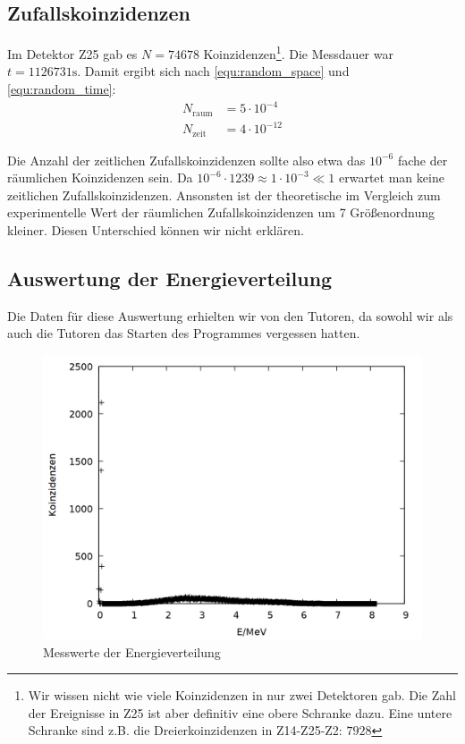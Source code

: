 \subsection{Zufallskoinzidenzen}
Im Detektor Z25 gab es $N = 74678$ Koinzidenzen\footnote{Wir wissen nicht wie viele Koinzidenzen in nur zwei Detektoren gab. Die Zahl der Ereignisse in Z25 ist aber definitiv eine obere Schranke dazu. Eine untere Schranke sind z.B. die Dreierkoinzidenzen in Z14-Z25-Z2: $7928$}. Die Messdauer war $t = 1126731 \si{\second}$. Damit ergibt sich nach \ref{equ:random_space} und \ref{equ:random_time}:\\
\begin{align*}
N_{\text{raum}} &= 5 \cdot 10^{-4}\\
N_{\text{zeit}} &= 4 \cdot 10^{-12}
\end{align*}

Die Anzahl der zeitlichen Zufallskoinzidenzen sollte also etwa das $10^{-6}$ fache der räumlichen Koinzidenzen sein. Da $10^{-6} \cdot 1239 \approx 1 \cdot 10^{-3} \ll 1$ erwartet man keine zeitlichen Zufallskoinzidenzen. Ansonsten ist der theoretische im Vergleich zum experimentelle Wert der räumlichen Zufallskoinzidenzen um 7 Größenordnung kleiner. Diesen Unterschied können wir nicht erklären.  
 
\subsection{Auswertung der Energieverteilung}

Die Daten für diese Auswertung erhielten wir von den Tutoren, da sowohl wir als auch die Tutoren das Starten des Programmes vergessen hatten.\\

\begin{figure}
\centering
\includegraphics[width=0.75\linewidth]{data/friedrich/mca_raw.png}
\caption{Messwerte der Energieverteilung}
\label{fig:mca_raw}
\end{figure}

